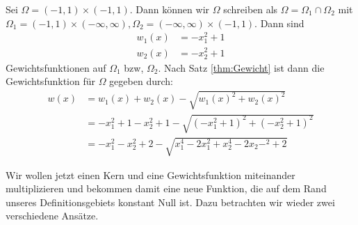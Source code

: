 \begin{example}
\label{ex:Gewicht}
Sei $\Omega = (-1,1) \times (-1,1)$. Dann können wir $\Omega$ schreiben als $\Omega = \Omega_1  \cap \Omega_2$ mit $\Omega_1 = (-1,1) \times (- \infty, \infty), \Omega_2 =   (- \infty, \infty) \times (-1,1)$.
Dann sind 
\begin{align*}
w_1(x) &= -x_1^2 +1\\
w_2(x) &= -x_2^2 +1 
\end{align*}
Gewichtsfunktionen auf $\Omega_1$ bzw, $\Omega_2$. Nach Satz \ref{thm:Gewicht} ist dann die Gewichtsfunktion für $\Omega$ gegeben durch:
\begin{align*}
w(x) &= w_1(x) + w_2(x) - \sqrt{w_1(x)^2 + w_2(x)^2}\\
&= -x_1^2 +1 -x_2^2 +1 - \sqrt{(-x_1^2+1)^2 + (-x_2^2+1)^2}\\
&= -x_1^2-x_2^2+2 - \sqrt{x_1^4 -2x_1^2 + x_2^4 -2x_2-^2+2}
\end{align*}
\end{example}
Wir wollen jetzt einen Kern und eine Gewichtsfunktion miteinander multiplizieren und bekommen damit eine neue Funktion, die auf dem Rand unseres Definitionsgebiets konstant Null ist. Dazu betrachten wir wieder zwei verschiedene Ansätze.

